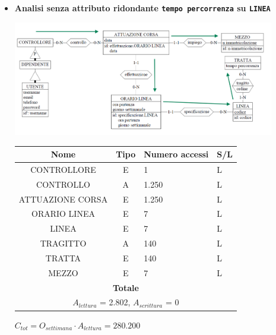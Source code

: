 \documentclass[12pt,a4paper]{report}
\begin{document}
\begin{enumerate}[label=\textbf{\arabic*}]
\begin{itemize}
    \item \textbf{Analisi senza attributo ridondante \texttt{tempo percorrenza} su \texttt{LINEA}}
    \begin{center}
    \includegraphics[width=0.9\textwidth]{VisualOrarioControlloriNoRid}
    \end{center}
    \begin{table}[H]
    \centering
    \begin{tabular}{|c|c|l|l|}
    \hline
    \textbf{Nome} & \textbf{Tipo} & \textbf{Numero accessi} & \textbf{S/L} \\
    \hline
    CONTROLLORE & E & 1 & L \\
    \hline
    CONTROLLO & A & 1.250 & L \\
    \hline
    ATTUAZIONE CORSA & E & 1.250 & L \\
    \hline
    ORARIO LINEA & E & 7 & L \\
    \hline
    LINEA & E & 7 & L \\
    \hline
    TRAGITTO & A & 140 & L \\
    \hline
    TRATTA & E & 140 & L \\
    \hline
    MEZZO & E & 7 & L \\
   \hline
    \multicolumn{4}{c}{\textbf{Totale}} \\
    \multicolumn{4}{c}{${A_{lettura}}$ = 2.802, ${A_{scrittura}}$ = 0} \\
    \hline
    \end{tabular}
    \end{table}
    \begin{center}
    ${C_{tot} = {O_{settimana}}\cdot{A_{lettura}}= 280.200}$
    \end{center}
    \end{itemize}



\end{enumerate}
\end{document}
